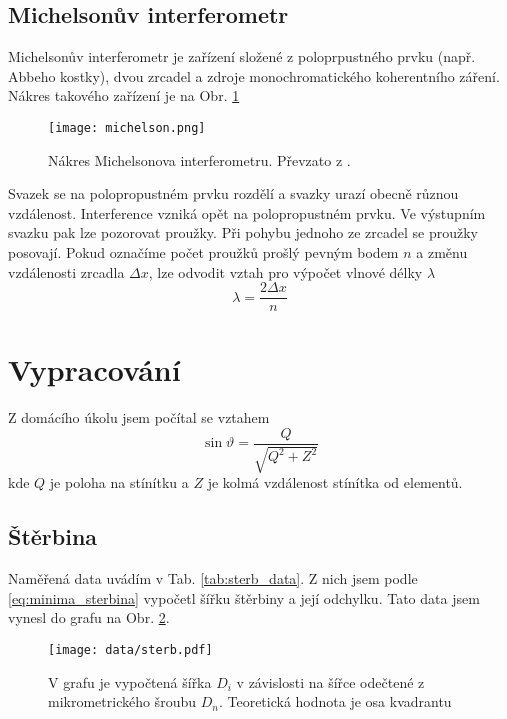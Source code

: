 	\subsection{Michelsonův interferometr} %
	\label{sub:michelsonův_interferometr}
		Michelsonův interferometr je zařízení složené z poloprpustného prvku (např. Abbeho kostky), dvou zrcadel a zdroje monochromatického koherentního záření. Nákres takového zařízení je na Obr. \ref{fig:Michelson_nakres}
		\begin{figure}[!ht]
			\begin{center}
				\texttt{[image: michelson.png]}
			\end{center}
			\caption{Nákres Michelsonova interferometru. Převzato z \cite{navod}.}
			\label{fig:Michelson_nakres}
		\end{figure}

		Svazek se na polopropustném prvku rozdělí a svazky urazí obecně různou vzdálenost. Interference vzniká opět na polopropustném prvku. Ve výstupním svazku pak lze pozorovat proužky. Při pohybu jednoho ze zrcadel se proužky posovají. Pokud označíme počet proužků prošlý pevným bodem $n$ a změnu vzdálenosti zrcadla $\Delta x$, lze odvodit \cite{navod} vztah pro výpočet vlnové délky $\lambda$
		\begin{equation}
			\lambda = \frac{2 \Delta x}{n}
			\label{eq:michelson}
		\end{equation}



\section{Vypracování} %
\label{sec:vypracování}
	Z domácího úkolu jsem počítal se vztahem
	\begin{equation}
		\sin \vartheta = \frac{Q}{\sqrt{Q^2 + Z^2}}
	\end{equation}
	kde $Q$ je poloha na stínítku a $Z$ je kolmá vzdálenost stínítka od elementů.

	\subsection{Štěrbina} %
	\label{sub:štěrbina}
		Naměřená data uvádím v Tab. \ref{tab:sterb_data}. Z nich jsem podle \eqref{eq:minima_sterbina} vypočetl šířku štěrbiny a její odchylku. Tato data jsem vynesl do grafu na Obr. \ref{fig:Sterb}. 
		
		\begin{figure}[!ht]
			\begin{center}
				\texttt{[image: data/sterb.pdf]}
			\end{center}
			\caption{V grafu je vypočtená šířka $D_i$ v závislosti na šířce odečtené z mikrometrického šroubu $D_n$. Teoretická hodnota je osa kvadrantu} 
			\label{fig:Sterb}
		\end{figure}


